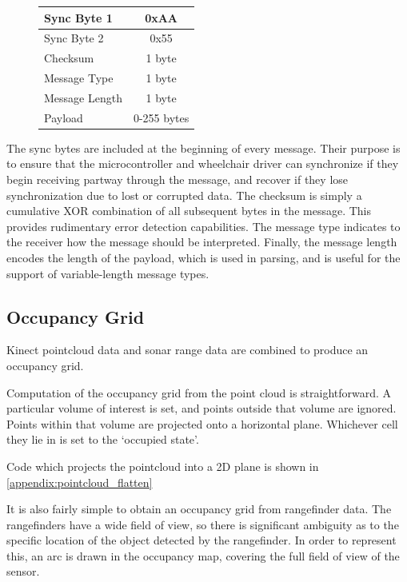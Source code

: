 \documentclass[oneside,final,a4paper]{report}
\begin{document}
\begin{figure}[hbt]
 \centering
 \begin{tabular}{|l|c|}
  \hline
   Sync Byte 1 & 0xAA \\ \hline
   Sync Byte 2 & 0x55 \\ \hline
   Checksum & 1 byte \\ \hline
   Message Type & 1 byte \\ \hline
   Message Length & 1 byte \\ \hline
   Payload & 0-255 bytes \\ \hline
 \end{tabular}
\end{figure}

The sync bytes are included at the beginning of every message.  Their purpose is to ensure that the microcontroller and wheelchair driver can synchronize if they begin receiving partway through the message, and recover if they lose synchronization due to lost or corrupted data.  The checksum is simply a cumulative XOR combination of all subsequent bytes in the message.  This provides rudimentary error detection capabilities.  The message type indicates to the receiver how the message should be interpreted.  Finally, the message length encodes the length of the payload, which is used in parsing, and is useful for the support of variable-length message types.

\subsection{Occupancy Grid}
Kinect pointcloud data and sonar range data are combined to produce an occupancy grid.  

Computation of the occupancy grid from the point cloud is straightforward.  A particular volume of interest is set, and points outside that volume are ignored.  Points within that volume are projected onto a horizontal plane.  Whichever cell they lie in is set to the `occupied state'.

Code which projects the pointcloud into a 2D plane is shown in \ref{appendix:pointcloud_flatten}

It is also fairly simple to obtain an occupancy grid from rangefinder data.  The rangefinders have a wide field of view, so there is significant ambiguity as to the specific location of the object detected by the rangefinder.  In order to represent this, an arc is drawn in the occupancy map, covering the full field of view of the sensor.
\end{document}
